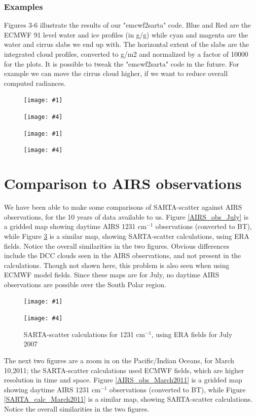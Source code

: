 \documentclass[11pt]{article}
\newcommand{\sasc}{\textsf{SARTA-scatter}\xspace}
\newcommand{\dfigure}[6]
{
\begin{figure}
  \begin{minipage}[t]{0.45\textwidth}
  \centering
  \texttt{[image: \#1]}
   \caption{#2}  \label{#3}
  \end{minipage}
  \hfil
  \begin{minipage}[t]{0.45\linewidth}
  \centering
  \texttt{[image: \#4]}
   \caption{#5}  \label{#6}
  \end{minipage}
\end{figure}
}
\newcommand{\wn}{cm$^{-1}$\xspace}
\begin{document}
\subsubsection{Examples}
Figures 3-6 illustrate the results of our "emcwf2sarta" code. Blue and Red are the ECMWF 91 level 
water and ice profiles (in g/g) while cyan and magenta are the water and cirrus slabs we end up with.
The horizontal extent of the slabs are the integrated cloud profiles, converted to g/m2 and normalized by
a factor of 10000 for the plots. It is possible to tweak the "emcwf2sarta" code in the future. For example
we can move the cirrus cloud higher, if we want to reduce overall computed radiances.

\dfigure{Figs/clouds_profile10.eps}{}{}{Figs/clouds_profile100.eps}{}{}
\dfigure{Figs/clouds_profile1000.eps}{}{}{Figs/clouds_profile2000.eps}{}{}


\section{Comparison to AIRS observations}

We have been able to make some comparisons of \sasc against AIRS observations, for the 10 years of data available 
to us. Figure \ref{AIRS_obs_July} is a gridded map showing daytime AIRS 1231 \wn observations (converted to BT),
while Figure \ref{SARTA_calc_July} is a similar map, showing \sasc calculations, using ERA fields. Notice the 
overall similarities in the two figures. Obvious differences include the DCC clouds seen in the AIRS observations,
and not present in the calculations. Though not shown here, this problem is also seen when using ECMWF model fields.
Since these maps are for July, no daytime AIRS observations are possible over the South Polar region.

\dfigure{Figs/yy_2007_mm_7_airs_global_obs1231_2}{AIRS BT1231 \wn observations in July 2007}{AIRS_obs_July}{Figs/yy_2007_mm_7_airs_global_eracal1231_2}{\sasc calculations for 1231 \wn, using ERA fields for July 2007}{SARTA_calc_July}

The next two figures are a zoom in on the Pacific/Indian Oceans, for March 10,2011; the \sasc calculations
used ECMWF fields, which are higher resolution in time and space. 
Figure \ref{AIRS_obs_March2011} is a gridded map showing daytime AIRS 1231 \wn observations (converted to BT),
while Figure \ref{SARTA_calc_March2011} is a similar map, showing \sasc calculations. Notice the 
overall similarities in the two figures. 
\end{document}
